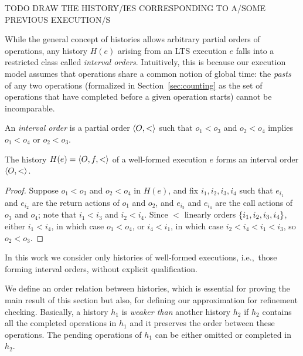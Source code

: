\begin{example}
  \label{ex:histories}

  TODO DRAW THE HISTORY/IES CORRESPONDING TO A/SOME PREVIOUS EXECUTION/S

\end{example}

While the general concept of histories allows arbitrary partial orders of
operations, any history $H(e)$ arising from an LTS execution $e$ falls into a
restricted class called \emph{interval orders}. Intuitively, this is because
our execution model assumes that operations share a common notion of global
time: the \emph{pasts} of any two operations (formalized in
Section~\ref{sec:counting} as the set of operations that have completed before
a given operation starts) cannot be incomparable.

\begin{definition}

  An \emph{interval order} is a partial order $\left\langle {O,<} \right\rangle$ such that
  $o_1 < o_3$ and $o_2 < o_4$ implies $o_1 < o_4$ or $o_2 < o_3$.

\end{definition}

\begin{lemma}
  \label{lem:intervals}

  The history $H(e) = \left\langle {O,f,<} \right\rangle$ of a well-formed execution $e$ forms an
  interval order $\left\langle {O,<} \right\rangle$.

\end{lemma}

\begin{proof}

  Suppose $o_1 < o_3$ and $o_2 < o_4$ in $H(e)$, and fix $i_1, i_2, i_3, i_4$
  such that $e_{i_1}$ and $e_{i_2}$ are the return actions of $o_1$ and $o_2$,
  and $e_{i_3}$ and $e_{i_4}$ are the call actions of $o_3$ and $o_4$; note
  that $i_1 < i_3$ and $i_2 < i_4$. Since $<$ linearly orders ${\{ i_1, i_2,
  i_3, i_4 \}}$, either $i_1 < i_4$, in which case $o_1 < o_4$, or $i_4 < i_1$, in
  which case $i_2 < i_4 < i_1 < i_3$, so $o_2 < o_3$.

\end{proof}

\noindent
In this work we consider only histories of well-formed executions, i.e.,~those
forming interval orders, without explicit qualification.

We define an order relation between histories, which is essential for proving
the main result of this section but also, for defining our approximation for
refinement checking. Basically, a history $h_1$ is \emph{weaker than} another
history $h_2$ if $h_2$ contains all the completed operations in $h_1$ and it
preserves the order between these operations. The pending operations of $h_1$
can be either omitted or completed in $h_2$.

